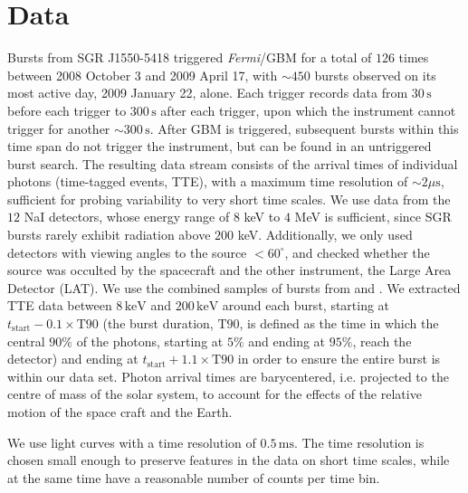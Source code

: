 \documentclass[12pt]{emulateapj}
\newcommand{\project}[1]{\textsl{#1}}
\newcommand{\Fermi}{\project{Fermi}}
\begin{document}

\section{Data}

Bursts from SGR J1550-5418 triggered \Fermi/GBM for a total of $126$ times between 2008 October 3 and 2009 April 17, with $\sim 450$ bursts observed on its most active day, 2009 January 22, alone. 
Each trigger records data from $30\,\mathrm{s}$ before each trigger to $300\,\mathrm{s}$ after each trigger, upon which the instrument cannot trigger for another $\sim 300 \,\mathrm{s}$. 
After GBM is triggered, subsequent bursts within this time span do not trigger the instrument, but can be found in an untriggered burst search. The resulting data stream consists of 
the arrival times of individual photons (time-tagged events, TTE), with a maximum time resolution of $\sim 2\mu\mathrm{s}$, sufficient for probing variability to very short time scales.
We use data from the $12$ NaI detectors, whose energy range of $8$ keV to $4$ MeV is sufficient, since SGR bursts rarely exhibit radiation above $200$ keV. Additionally, we only used detectors with viewing angles to the source $< 60^{\circ}$, and checked whether the source was occulted by the spacecraft and the other instrument, the Large Area Detector (LAT). We use the combined samples of bursts from \citet{vonkienlin2012} and \citet{vanderhorst2012}. 
We extracted TTE data between $8 \, \mathrm{keV}$ and $200 \, \mathrm{keV}$ around each burst, starting at $t_{\mathrm{start}} - 0.1 \times\mathrm{T}90$ (the burst duration, $\mathrm{T}90$, is defined as the time in which the central $90\%$ of the photons, starting at $5\%$ and ending at $95\%$, reach the detector) and ending at $t_{\mathrm{start}} + 1.1\times\mathrm{T}90$ in order to ensure the entire burst is within our data set. Photon arrival times are barycentered, i.e. projected to the centre of mass of the solar system, to account for the effects of the relative motion of the space craft and the Earth.

We use light curves with a time resolution of $0.5\,\mathrm{ms}$. The time resolution is chosen small enough to preserve features
in the data on short time scales, while at the same time have a reasonable number of counts per time bin. 
\end{document}
